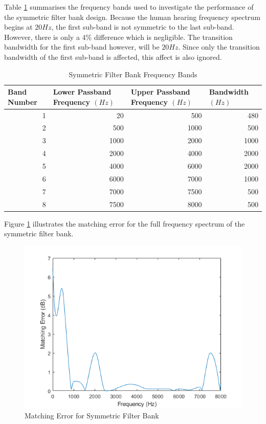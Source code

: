 \documentclass[11pt,onecolumn]{witseiepaper}
\begin{document}
\begin{appendices}
\noindent Table \ref{tab:symFreqBand} summarises the frequency bands used to investigate the performance of the symmetric filter bank design. Because the human hearing frequency spectrum begins at $20Hz$, the first sub-band is not symmetric to the last sub-band. However, there is only a $4\%$ difference which is negligible. The transition bandwidth for the first sub-band however, will be $20Hz$. Since only the transition bandwidth of the first sub-band is affected, this affect is also ignored.

\begin{table}[htbp]
  \centering
  \caption{Symmetric Filter Bank Frequency Bands}
  \begin{adjustbox}{width=0.9\linewidth}
    \begin{tabular}{|r|r|r|r|}
    \hline
    \multicolumn{1}{|l|}{\textbf{Band Number}} & \multicolumn{1}{l|}{\textbf{Lower Passband Frequency $(Hz)$}} & \multicolumn{1}{l|}{\textbf{Upper Passband Frequency $(Hz)$}} & \multicolumn{1}{l|}{\textbf{Bandwidth $(Hz)$}} \\
    \hline
    1     & 20    & 500   & 480 \\
    \hline
    2     & 500   & 1000  & 500 \\
    \hline
    3     & 1000  & 2000  & 1000 \\
    \hline
    4     & 2000  & 4000  & 2000 \\
    \hline
    5     & 4000  & 6000  & 2000 \\
    \hline
    6     & 6000  & 7000  & 1000 \\
    \hline
    7     & 7000  & 7500  & 500 \\
    \hline
    8     & 7500  & 8000  & 500 \\
    \hline
    \end{tabular}%
    \end{adjustbox}
  \label{tab:symFreqBand}%
\end{table}%

\noindent Figure \ref{fig:symMatErr} illustrates the matching error for the full frequency spectrum of the symmetric filter bank.

\begin{figure}[h]
\centering
\includegraphics[width=0.6\linewidth]{symMatErr.PNG}
\caption{Matching Error for Symmetric Filter Bank}
\label{fig:symMatErr}
\end{figure}  



\end{appendices}
\end{document}
